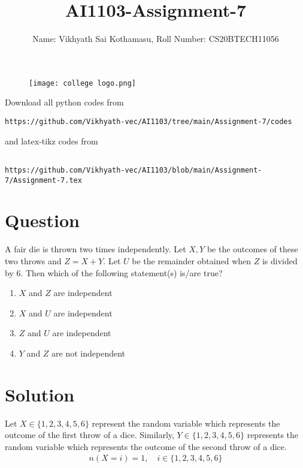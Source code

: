 \documentclass[journal,12pt,twocolumn]{IEEEtran}
\begin{document}
\title{AI1103-Assignment-7}
\author{Name: Vikhyath Sai Kothamasu, Roll Number: CS20BTECH11056}
\maketitle
\newpage
\bigskip
\renewcommand{\thefigure}{\theenumi}
\renewcommand{\thetable}{\theenumi}

\begin{figure} [h]
    \texttt{[image: college logo.png]}
\end{figure}

Download all python codes from 
\begin{lstlisting}
https://github.com/Vikhyath-vec/AI1103/tree/main/Assignment-7/codes
\end{lstlisting}
%
and latex-tikz codes from 
%
\begin{lstlisting}

https://github.com/Vikhyath-vec/AI1103/blob/main/Assignment-7/Assignment-7.tex
\end{lstlisting}
\section*{Question}
A fair die is thrown two times independently. Let $X,Y$ be the outcomes of these two throws and $Z=X+Y$. Let $U$ be the remainder obtained when $Z$ is divided by 6. Then which of the following statement(s) is/are true?
\begin{enumerate}
    \item $X$ and $Z$ are independent \label{option 1}
    \item $X$ and $U$ are independent \label{option 2}
    \item $Z$ and $U$ are independent \label{option 3}
    \item $Y$ and $Z$ are not independent \label{option 4}
\end{enumerate}

\section*{Solution}

Let $X \in \{1,2,3,4,5,6\}$ represent the random variable which represents the outcome of the first throw of a dice. Similarly, $Y \in \{1,2,3,4,5,6\}$ represents the random variable which represents the outcome of the second throw of a dice.
\begin{align}
    n(X=i) = 1, \quad i \in \{1, 2, 3, 4, 5, 6\}
\end{align}
\end{document}
